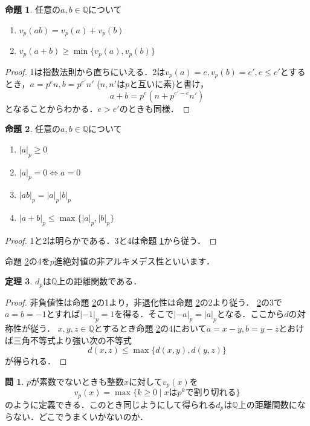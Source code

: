 \documentclass[uplatex]{jsarticle}
\newcommand{\Q}{\mathbb{Q}}
\theoremstyle{definition} %
\newtheorem{thm}{定理}
\newtheorem{prop}[thm]{命題}
\newtheorem*{exercise*}{問}
\begin{document}
\begin{oframed}\begin{prop}\label{prop:1}
任意の$a, b \in \Q$について
\begin{enumerate}
\item $v_p(ab) = v_p(a) + v_p(b)$
\item $v_p(a+b) \geq \min\{v_p(a), v_p(b)\}$
\end{enumerate}
\end{prop}\end{oframed}
\begin{proof}
1は指数法則から直ちにいえる．2は$v_p(a) = e, v_p(b) = e', e \leq e'$とするとき，$a = p^e n, b = p^{e'} n'$ ($n, n'$は$p$と互いに素)と書け，
\[a + b = p^e(n + p^{e'-e} n')\]
となることからわかる．$e > e'$のときも同様．
\end{proof}

\begin{oframed}\begin{prop}\label{prop:2}
任意の$a, b \in \Q$について
\begin{enumerate}
\item $|a|_p \geq 0$
\item $|a|_p = 0 \iff a = 0$
\item $|ab|_p = |a|_p |b|_p$
\item $|a+b|_p \leq \max\{|a|_p, |b|_p\}$
\end{enumerate}
\end{prop}\end{oframed}
\begin{proof}
1と2は明らかである．3と4は命題 \ref{prop:1}から従う．
\end{proof}

命題 \ref{prop:2}の4を$p$進絶対値の非アルキメデス性といいます．

\begin{oframed}\begin{thm}
$d_p$は$\Q$上の距離関数である．
\end{thm}\end{oframed}
\begin{proof}
非負値性は命題 \ref{prop:2}の1より，非退化性は命題 \ref{prop:2}の2より従う．
\ref{prop:2}の3で$a=b=-1$とすれば$|-1|_p = 1$を得る．そこで$|-a|_p = |a|_p$となる．ここから$d$の対称性が従う．
$x, y, z \in \Q$とするとき命題 \ref{prop:2}の4において$a = x - y, b = y - z$とおけば三角不等式より強い次の不等式
\[d(x, z) \leq \max\{d(x, y), d(y, z)\} \]
が得られる．
\end{proof}

\begin{exercise*}
$p$が素数でないときも整数$x$に対して$v_p(x)$を
\[v_p(x) = \max\{k\geq0\mid xはp^kで割り切れる \}\]
のように定義できる．このとき同じようにして得られる$d_p$は$\Q$上の距離関数にならない．どこでうまくいかないのか．
\end{exercise*}
\end{document}
